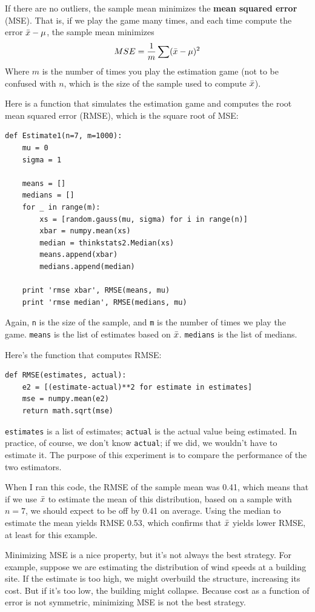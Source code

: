 \documentclass[12pt]{book}
\begin{document}
If there are no outliers, the sample mean minimizes the {\bf mean squared
error} (MSE).  That is, if we play the game many times, and each time
compute the error $\bar{x} - \mu$, the sample mean minimizes
%
\[ MSE = \frac{1}{m} \sum (\bar{x} - \mu)^2 \]
%
Where $m$ is the number of times you play the estimation game (not to
be confused with $n$, which is the size of the sample used to compute
$\bar{x}$).

Here is a function that simulates the estimation game and computes
the root mean squared error (RMSE), which is the square root of
MSE:

\begin{verbatim}
def Estimate1(n=7, m=1000):
    mu = 0
    sigma = 1

    means = []
    medians = []
    for _ in range(m):
        xs = [random.gauss(mu, sigma) for i in range(n)]
        xbar = numpy.mean(xs)
        median = thinkstats2.Median(xs)
        means.append(xbar)
        medians.append(median)

    print 'rmse xbar', RMSE(means, mu)
    print 'rmse median', RMSE(medians, mu)
\end{verbatim}

Again, {\tt n} is the size of the sample, and {\tt m} is the
number of times we play the game.  {\tt means} is the list of
estimates based on $\bar{x}$.  {\tt medians} is the list of medians.

Here's the function that computes RMSE:

\begin{verbatim}
def RMSE(estimates, actual):
    e2 = [(estimate-actual)**2 for estimate in estimates]
    mse = numpy.mean(e2)
    return math.sqrt(mse)
\end{verbatim}

{\tt estimates} is a list of estimates; {\tt actual} is the
actual value being estimated.  In practice, of course, we don't
know {\tt actual}; if we did, we wouldn't have to estimate it.
The purpose of this experiment is to compare the performance of
the two estimators.

When I ran this code, the RMSE of the sample mean was 0.41, which
means that if we use $\bar{x}$ to estimate the mean of this
distribution, based on a sample with $n=7$, we should expect to be off
by 0.41 on average.  Using the median to estimate the mean yields
RMSE 0.53, which confirms that $\bar{x}$ yields lower RMSE, at least
for this example.

Minimizing MSE is a nice property, but it's not always the best
strategy.  For example, suppose we are estimating the distribution of
wind speeds at a building site.  If the estimate is too high, we might
overbuild the structure, increasing its cost.  But if it's too
low, the building might collapse.  Because cost as a function of
error is not symmetric, minimizing MSE is not the best strategy.
\end{document}
